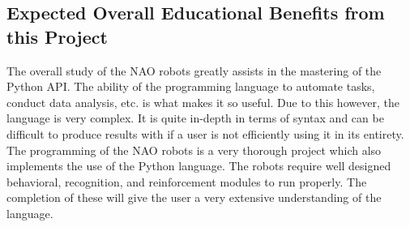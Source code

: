 \subsection{Expected Overall Educational Benefits from this Project}

The overall study of the NAO robots greatly assists in the mastering of the Python API. The ability of the programming language to automate tasks, conduct data analysis, etc. is what makes it so useful. Due to this however, the language is very complex. It is quite in-depth in terms of syntax and can be difficult to produce results with if a user is not efficiently using it in its entirety. The programming of the NAO robots is a very thorough project which also implements the use of the Python language. The robots require well designed behavioral, recognition, and reinforcement modules to run properly. The completion of these will give the user a very extensive understanding of the language.\par